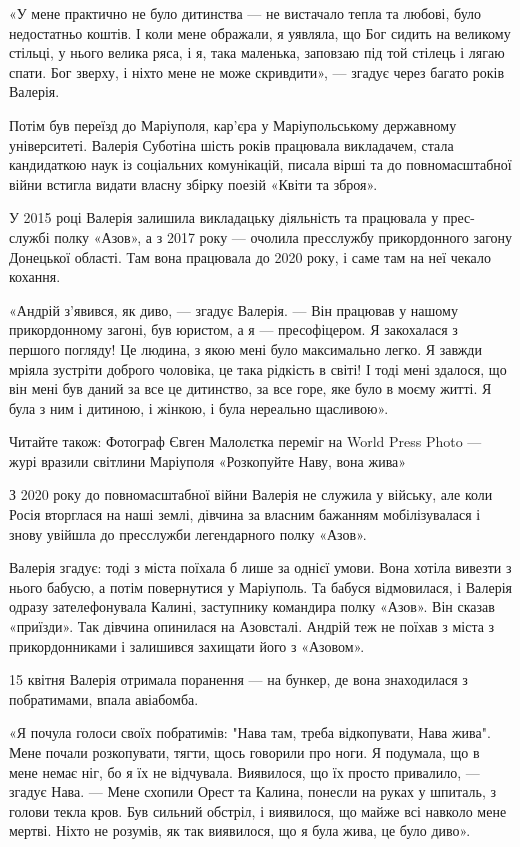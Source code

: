 «У мене практично не було дитинства — не вистачало тепла та любові, було
недостатньо коштів. І коли мене ображали, я уявляла, що Бог сидить на великому
стільці, у нього велика ряса, і я, така маленька, заповзаю під той стілець і
лягаю спати. Бог зверху, і ніхто мене не може скривдити», — згадує через багато
років Валерія.

Потім був переїзд до Маріуполя, кар'єра у Маріупольському державному
університеті. Валерія Суботіна шість років працювала викладачем, стала
кандидаткою наук із соціальних комунікацій, писала вірші та до повномасштабної
війни встигла видати власну збірку поезій «Квіти та зброя».

У 2015 році Валерія залишила викладацьку діяльність та працювала у прес-службі
полку «Азов», а з 2017 року — очолила пресслужбу прикордонного загону Донецької
області. Там вона працювала до 2020 року, і саме там на неї чекало кохання.

«Андрій з'явився, як диво, — згадує Валерія. — Він працював у нашому
прикордонному загоні, був юристом, а я — пресофіцером. Я закохалася з першого
погляду! Це людина, з якою мені було максимально легко. Я завжди мріяла
зустріти доброго чоловіка, це така рідкість в світі! І тоді мені здалося, що
він мені був даний за все це дитинство, за все горе, яке було в моєму житті. Я
була з ним і дитиною, і жінкою, і була нереально щасливою».

Читайте також: Фотограф Євген Малолєтка переміг на World Press Photo — журі вразили світлини Маріуполя
«Розкопуйте Наву, вона жива»

З 2020 року до повномасштабної війни Валерія не служила у війську, але коли Росія вторглася на наші землі, дівчина за власним бажанням мобілізувалася і знову увійшла до пресслужби легендарного полку «Азов».

Валерія згадує: тоді з міста поїхала б лише за однієї умови. Вона хотіла вивезти з нього бабусю, а потім повернутися у Маріуполь. Та бабуся відмовилася, і Валерія одразу зателефонувала Калині, заступнику командира полку «Азов». Він сказав «приїзди». Так дівчина опинилася на Азовсталі. Андрій теж не поїхав з міста з прикордонниками і залишився захищати його з «Азовом».

15 квітня Валерія отримала поранення — на бункер, де вона знаходилася з
побратимами, впала авіабомба.

«Я почула голоси своїх побратимів: "Нава там, треба відкопувати, Нава жива".
Мене почали розкопувати, тягти, щось говорили про ноги. Я подумала, що в мене
немає ніг, бо я їх не відчувала. Виявилося, що їх просто привалило, — згадує
Нава. — Мене схопили Орест та Калина, понесли на руках у шпиталь, з голови
текла кров. Був сильний обстріл, і виявилося, що майже всі навколо мене мертві.
Ніхто не розумів, як так виявилося, що я була жива, це було диво».

